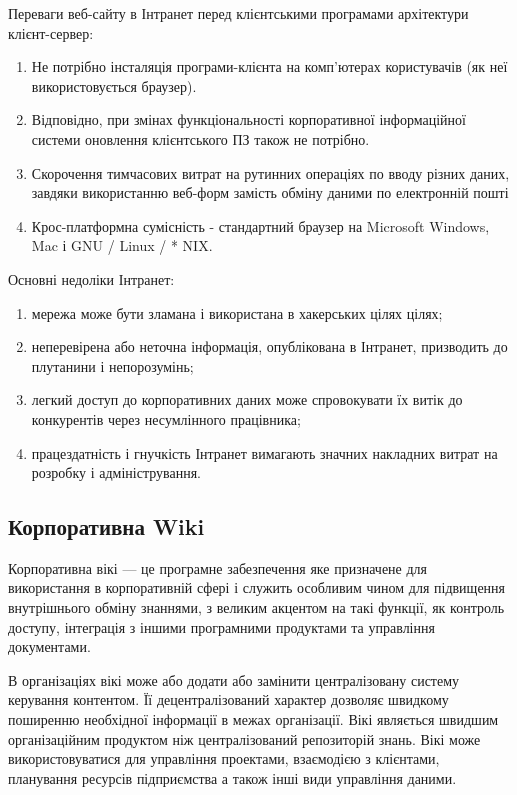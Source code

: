 Переваги веб-сайту в Інтранет перед клієнтськими програмами архітектури клієнт-сервер:
\begin{enumerate}
\item Не потрібно інсталяція програми-клієнта на комп'ютерах користувачів (як неї використовується браузер).
\item Відповідно, при змінах функціональності корпоративної інформаційної системи оновлення клієнтського ПЗ також не потрібно.
\item  Скорочення тимчасових витрат на рутинних операціях по вводу різних даних, завдяки використанню веб-форм замість обміну даними по електронній пошті
\item Крос-платформна сумісність - стандартний браузер на Microsoft Windows, Mac і GNU / Linux / * NIX.
\end{enumerate}


Основні недоліки Інтранет:
\begin{enumerate}
\item мережа може бути зламана і використана в хакерських цілях цілях;
\item неперевірена або неточна інформація, опублікована в Інтранет, призводить до плутанини і непорозумінь;
\item легкий доступ до корпоративних даних може спровокувати їх витік до конкурентів через несумлінного працівника;
\item працездатність і гнучкість Інтранет вимагають значних накладних витрат на розробку і адміністрування.
\end{enumerate}








\subsection{Корпоративна Wiki}

Корпоративна вікі --- це програмне забезпечення яке призначене для використання в корпоративній сфері і служить особливим чином для підвищення внутрішнього обміну знаннями, з великим акцентом на такі функції, як контроль доступу, інтеграція з іншими програмними продуктами та управління документами. 
\par В організаціях вікі може або додати або замінити централізовану систему керування контентом. 
Її децентралізований характер дозволяє швидкому поширенню необхідної інформації в межах організації.
Вікі являється швидшим організаційним продуктом ніж централізований репозиторій знань.
Вікі може використовуватися для управління проектами, взаємодією з клієнтами, планування ресурсів підприємства а також інші види управління даними.

